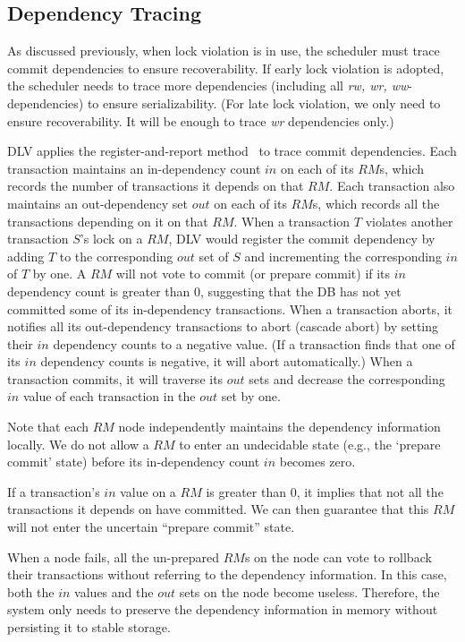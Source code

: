 \documentclass[conference]{IEEEtran}
\begin{document}
\subsection{Dependency Tracing}
As discussed previously, when lock violation is in use,
the scheduler must trace commit dependencies to ensure recoverability.
If early lock violation is adopted, the scheduler needs to trace more dependencies (including all \emph{rw, wr, ww}-dependencies) to ensure serializability.
(For late lock violation, we only need to ensure recoverability.
It will be enough to trace \emph{wr} dependencies only.)

DLV applies the register-and-report method~\cite{HeckatonMVCC:journals/pvldb/LarsonBDFPZ11} to trace commit dependencies.
Each transaction maintains an in-dependency count ${in}$ on each of its ${RM}$s, which records the number of transactions it depends on that ${RM}$.
Each transaction also maintains an out-dependency set  ${out}$ on each of its ${RM}$s, which records all the transactions depending on it on that ${RM}$.
When a transaction ${T}$ violates another transaction ${S}$'s lock on a ${RM}$,
DLV would register the commit dependency by adding ${T}$ to the corresponding ${out}$ set of ${S}$ and incrementing the corresponding ${in}$ of ${T}$ by one.
A ${RM}$ will not vote to commit (or prepare commit) if its ${in}$ dependency count is greater than 0, suggesting that the DB has not yet committed some of its in-dependency transactions.
When a transaction aborts, it notifies all its out-dependency transactions to abort (cascade abort) by setting their ${in}$ dependency counts to a negative value.
(If a transaction finds that one of its ${in}$ dependency counts is negative, it will abort automatically.)
When a transaction commits, it will traverse its ${out}$ sets and decrease the corresponding ${in}$ value of each transaction in the ${out}$ set by one.

Note that each $RM$ node independently maintains the dependency information locally.
We do not allow a ${RM}$ to enter an undecidable state (e.g., the `prepare commit' state) before its in-dependency count ${in}$ becomes zero.

If a transaction's ${in}$ value on a ${RM}$ is greater than 0, it implies that not all the transactions it depends on have committed.
We can then guarantee that this ${RM}$ will not enter the uncertain ``prepare commit'' state.

When a node fails, all the un-prepared ${RM}$s on the node can vote to rollback their transactions without referring to the dependency information.
In this case, both the ${in}$ values and the ${out}$ sets on the node become useless.
Therefore, the system only needs to preserve the dependency information in memory without persisting it to stable storage.
\end{document}
